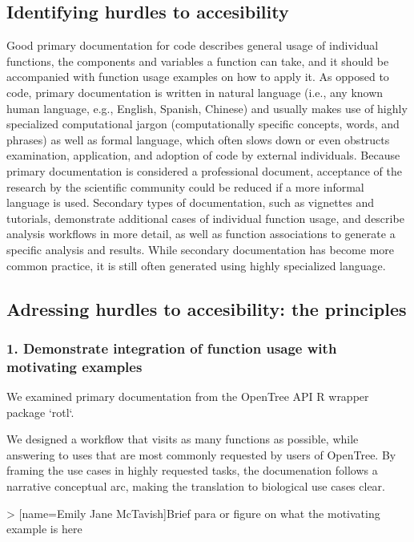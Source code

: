 \documentclass[12pt]{article}
\begin{document}
\subsection*{Identifying hurdles to accesibility}

Good primary documentation for code describes general usage of individual functions, the components and variables a function can take, and it should be accompanied with function usage examples on how to apply it.
As opposed to code, primary documentation is written in natural language (i.e., any known human language, e.g., English, Spanish, Chinese) and usually makes use of highly specialized computational jargon (computationally specific concepts, words, and phrases) as well as formal language, which often slows down or even obstructs examination, application, and adoption of code by external individuals.
Because primary documentation is considered a professional document, acceptance of the research by the scientific community could be reduced if a more informal language is used.
Secondary types of documentation, such as vignettes and tutorials, demonstrate additional cases of individual function usage, and describe analysis workflows in more detail, as well as function associations to generate a specific analysis and results. While secondary documentation has become more common practice, it is still often generated using highly specialized language.

\subsection*{Adressing hurdles to accesibility: the principles}

\subsubsection*{1. Demonstrate integration of function usage with motivating examples}

We examined primary documentation from the OpenTree API R wrapper package `rotl`.

We designed a workflow that visits as many functions as possible, while answering to uses that are most commonly requested by users of OpenTree.
By framing the use cases in highly requested tasks, the documenation follows a narrative conceptual arc, making the translation to biological use cases clear.

> [name=Emily Jane McTavish]Brief para or figure on what the motivating example is here
\end{document}
